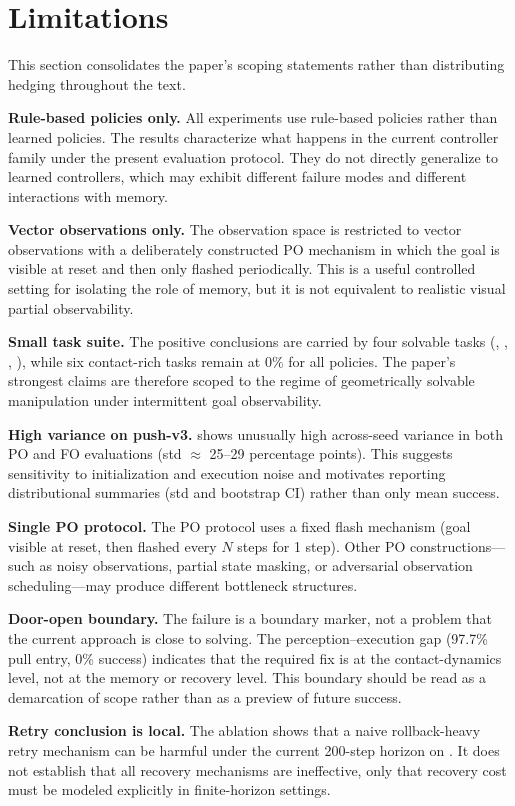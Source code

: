 \section{Limitations}
\label{sec:limitations}

This section consolidates the paper's scoping statements rather than distributing hedging throughout the text.

\textbf{Rule-based policies only.}
All experiments use rule-based policies rather than learned policies. The results characterize what happens in the current controller family under the present evaluation protocol. They do not directly generalize to learned controllers, which may exhibit different failure modes and different interactions with memory.

\textbf{Vector observations only.}
The observation space is restricted to vector observations with a deliberately constructed PO mechanism in which the goal is visible at reset and then only flashed periodically. This is a useful controlled setting for isolating the role of memory, but it is not equivalent to realistic visual partial observability.

\textbf{Small task suite.}
The positive conclusions are carried by four solvable tasks (, , , ), while six contact-rich tasks remain at $0\%$ for all policies. The paper's strongest claims are therefore scoped to the regime of geometrically solvable manipulation under intermittent goal observability.

\textbf{High variance on push-v3.}
 shows unusually high across-seed variance in both PO and FO evaluations (std $\approx$ 25--29 percentage points). This suggests sensitivity to initialization and execution noise and motivates reporting distributional summaries (std and bootstrap CI) rather than only mean success.

\textbf{Single PO protocol.}
The PO protocol uses a fixed flash mechanism (goal visible at reset, then flashed every $N$ steps for 1 step). Other PO constructions---such as noisy observations, partial state masking, or adversarial observation scheduling---may produce different bottleneck structures.

\textbf{Door-open boundary.}
The  failure is a boundary marker, not a problem that the current approach is close to solving. The perception--execution gap (97.7\% pull entry, 0\% success) indicates that the required fix is at the contact-dynamics level, not at the memory or recovery level. This boundary should be read as a demarcation of scope rather than as a preview of future success.

\textbf{Retry conclusion is local.}
The ablation shows that a naive rollback-heavy retry mechanism can be harmful under the current 200-step horizon on . It does not establish that all recovery mechanisms are ineffective, only that recovery cost must be modeled explicitly in finite-horizon settings.

